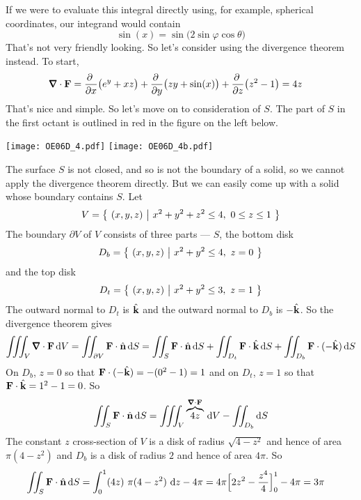 \begin{solution}
If we were to evaluate this integral directly using, for example,
spherical coordinates, our integrand would contain
\begin{equation*}
\sin(x) = \sin\big(2\sin\varphi\cos\theta\big)
\end{equation*}
That's not very friendly looking. So let's consider using the divergence
theorem instead. To start, 
\begin{align*}
\vnabla\cdot\vF &= 
    \pdiff{}{x}\big(e^y + xz\big)
     +\pdiff{}{y}\big(zy + \sin(x)\big)
     +\pdiff{}{z}\big(z^2 - 1\big) 
   = 4z
\end{align*}
That's nice and simple. So let's move on to consideration of $S$.
The part of $S$ in the first octant is outlined in red in the figure 
on the left below.

\begin{center}
       \texttt{[image: OE06D\_4.pdf]}\qquad
       \texttt{[image: OE06D\_4b.pdf]}
\end{center}

The surface $S$ is not closed, and so is not the boundary of a solid,
so we cannot apply the divergence theorem directly. But we can easily
come up with a solid whose boundary contains $S$. Let
\begin{equation*}
V=\big\{ \ (x,y,z)\ \big|\  x^2 + y^2 + z^2 \le 4,\ 0\le z\le 1\ \big\}
\end{equation*}
The boundary $\partial V$ of $V$ consists of three parts --- $S$,
the bottom disk
\begin{equation*}
D_b = \big\{ \ (x,y,z)\ \big|\ x^2 + y^2 \le 4,\ z=0\ \big\}
\end{equation*}
and the top disk
\begin{equation*}
D_t = \Set{(x,y,z)}{x^2 + y^2 \le 3,\ z=1}
\end{equation*}
The outward normal to $D_t$ is $\hat{\mathbf{k}}$ and the outward normal to $D_b$ is $-\hat{\mathbf{k}}$.
So the divergence theorem gives
\begin{align*}
\tripInt_V\vnabla\cdot\vF\,\dee{V}
=\dblInt_{\partial V} \vF\cdot\hn\,\dee{S}
=\dblInt_S \vF\cdot\hn\,\dee{S}
  +\dblInt_{D_t} \vF\cdot\hk\,\dee{S}
  +\dblInt_{D_b} \vF\cdot(-\hk)\,\dee{S}
\end{align*}
On $D_b$, $z=0$ so that $\mathbf{F}\cdot(-\hat{\mathbf{k}}) = -(0^2-1)=1$ and
on $D_t$, $z=1$ so that $\mathbf{F}\cdot\hat{\mathbf{k}} = 1^2-1=0$.
So
\begin{align*}
\dblInt_S \vF\cdot\hn\,\dee{S}
=\tripInt_V\overbrace{4z}^{\vnabla\cdot\vF}\,\dee{V}
   -\dblInt_{D_b} \dee{S}
\end{align*}
The constant $z$ cross-section of $V$ is a disk of radius $\sqrt{4-z^2}$
and hence of area $\pi(4-z^2)$ and $D_b$ is a disk of radius $2$ and hence
of area $4\pi$. So
\begin{align*}
\iint_S \mathbf{F}\cdot\hat{\mathbf{n}}\,\mathrm{d}S
&=\int_0^1 (4z)\ \pi(4-z^2) \ \mathrm{d}z  -4\pi 
=4\pi\Big[2z^2 - \frac{z^4}{4}\Big]_0^1 -4\pi
=3\pi
\end{align*}
\end{solution}


